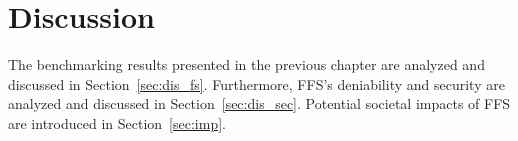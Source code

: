 
\chapter{Discussion}
\label{ch:discussion}
The benchmarking results presented in the previous chapter are analyzed and discussed in Section~\ref{sec:dis_fs}. Furthermore, \gls{FFS}'s deniability and security are analyzed and discussed in Section~\ref{sec:dis_sec}. Potential societal impacts of \gls{FFS} are introduced in Section~\ref{sec:imp}.







